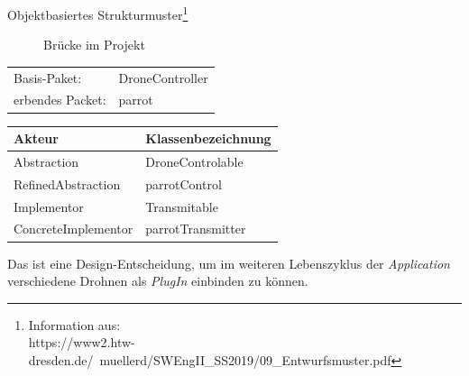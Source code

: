 
Objektbasiertes Strukturmuster\footnote{Information aus:\\https://www2.htw-dresden.de/~muellerd/SWEngII\_SS2019/09\_Entwurfsmuster.pdf}


\begin{figure}[ht!]
\vspace{0.25cm}
\begin{center}
\caption{Brücke im Projekt}
\label{fig:Bridge}
\end{center}

\vspace{0.25cm}
\end{figure}


\begin{tabular}{ll}
Basis-Paket:		& DroneController\\
erbendes Packet:	& parrot
\end{tabular}
\begin{table}[!ht]
\begin{tabular}{ll}
Akteur			& Klassenbezeichnung \\ \hline
Abstraction		& DroneControlable\\
RefinedAbstraction	& parrotControl\\
Implementor		& Transmitable\\
ConcreteImplementor	& parrotTransmitter\\
\end{tabular}
\end{table}


Das ist eine Design-Entscheidung, um im weiteren Lebenszyklus der \textit{Application} verschiedene Drohnen als \textit{PlugIn} einbinden zu können.











